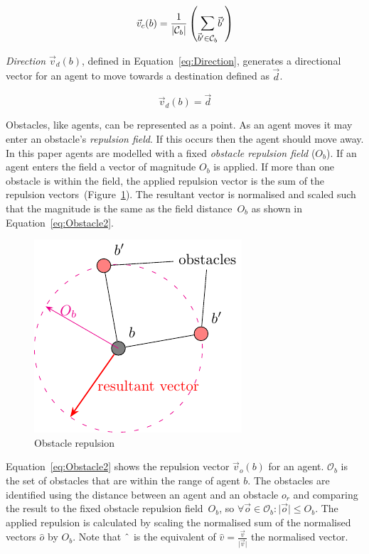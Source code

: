 \documentclass{ieeeaccess}
\newcommand{\card}[1]{\vert{#1}\vert}
\newcommand{\magn}[1]{\vert{#1}\vert}
\begin{document}
\begin{equation}\label{eq:FlyToCentre1}
	\vec v_c(b) =
	\frac{1}{\card{\mathcal C_b}}\left({\mathlarger{\sum_{\vec b' \in
	\mathcal C_b}}{\vec b'}}\right)
\end{equation}

\textit{Direction} $\vec v_d(b)$, defined in Equation~\ref{eq:Direction},
generates a directional vector for an agent to move towards a destination
defined as $\vec d$.

\begin{equation}
\label{eq:Direction}
\vec v_d(b) = \vec d
\end{equation}

Obstacles, like agents, can be represented as a point. As an agent moves it may enter an obstacle's \textit{repulsion field}. If this occurs then the agent should move away. In this paper agents are modelled with a fixed \textit{obstacle repulsion field} ($O_b$). If an agent enters the field a vector of magnitude $O_b$ is applied. If more than one obstacle is within the field, the applied repulsion vector is the sum of the repulsion vectors~(Figure~\ref{fig:Obstacle1}). The resultant vector is normalised and scaled such that the magnitude is the same as the field distance~$O_b$ as shown in Equation~\ref{eq:Obstacle2}.

\begin{figure}[H]
\begin{center}
\includegraphics{figures/obstacles}
\end{center}
\caption{Obstacle repulsion \label{fig:Obstacle1}}
\end{figure}

Equation~\ref{eq:Obstacle2} shows the repulsion vector $\vec v_o(b)$ for an agent.
$\mathcal O_b$ is the set of obstacles that are within the range of agent $b$.
The obstacles are identified using the distance between an agent and an
obstacle $o_r$ and comparing the result to the fixed obstacle repulsion
field~$O_b$, so $\forall \vec o \in \mathcal O_b : \magn{\vec o}\leq O_b$.
The applied repulsion is calculated by scaling the normalised sum of the
normalised vectors $\hat o$ by $O_b$.  Note that $\string^$ is the equivalent
of $\hat v = \frac{\vec v}{\magn{\vec v}}$ the normalised vector.
\end{document}
